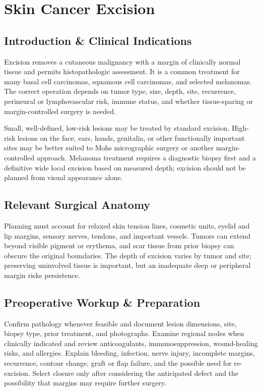 \chapter{Skin Cancer Excision}

\section*{Introduction \& Clinical Indications}
Excision removes a cutaneous malignancy with a margin of clinically normal tissue and permits histopathologic assessment. It is a common treatment for many basal cell carcinomas, squamous cell carcinomas, and selected melanomas. The correct operation depends on tumor type, size, depth, site, recurrence, perineural or lymphovascular risk, immune status, and whether tissue-sparing or margin-controlled surgery is needed.

Small, well-defined, low-risk lesions may be treated by standard excision. High-risk lesions on the face, ears, hands, genitalia, or other functionally important sites may be better suited to Mohs micrographic surgery or another margin-controlled approach. Melanoma treatment requires a diagnostic biopsy first and a definitive wide local excision based on measured depth; excision should not be planned from visual appearance alone.

\section*{Relevant Surgical Anatomy}
Planning must account for relaxed skin tension lines, cosmetic units, eyelid and lip margins, sensory nerves, tendons, and important vessels. Tumors can extend beyond visible pigment or erythema, and scar tissue from prior biopsy can obscure the original boundaries. The depth of excision varies by tumor and site; preserving uninvolved tissue is important, but an inadequate deep or peripheral margin risks persistence.

\section*{Preoperative Workup \& Preparation}
Confirm pathology whenever feasible and document lesion dimensions, site, biopsy type, prior treatment, and photographs. Examine regional nodes when clinically indicated and review anticoagulants, immunosuppression, wound-healing risks, and allergies. Explain bleeding, infection, nerve injury, incomplete margins, recurrence, contour change, graft or flap failure, and the possible need for re-excision. Select closure only after considering the anticipated defect and the possibility that margins may require further surgery.

